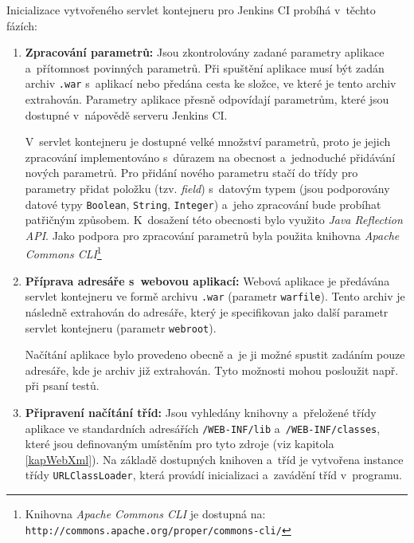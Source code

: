             Inicializace vytvořeného servlet kontejneru pro Jenkins CI probíhá
            v~těchto fázích:
            \begin{enumerate}
                \item \textbf{Zpracování parametrů:} Jsou zkontrolovány zadané parametry
                    aplikace a~přítomnost povinných parametrů. Při spuštění aplikace
                    musí být zadán archiv \texttt{.war} s~aplikací nebo předána cesta
                    ke složce, ve které je tento archiv extrahován. 
                    Parametry aplikace
                    přesně odpovídají parametrům, které jsou dostupné v~nápovědě 
                    serveru Jenkins CI. 
                    
                    V~servlet kontejneru je dostupné velké množství parametrů,
                    proto je jejich zpracování implementováno s~důrazem na obecnost a~jednoduché
                    přidávání nových parametrů. 
                    Pro přidání nového parametru stačí do třídy pro parametry přidat položku (tzv. \emph{field})
                    s~datovým typem (jsou podporovány datové typy \texttt{Boolean}, \texttt{String}, 
                    \texttt{Integer}) a~jeho zpracování bude probíhat patřičným
                    způsobem. K~dosažení této obecnosti bylo využito \emph{Java Reflection API}.
                    Jako podpora pro zpracování parametrů byla použita knihovna \emph{Apache
                    Commons CLI}\footnote{Knihovna \emph{Apache Commons CLI} je 
                    dostupná na: \texttt{http://commons.apache.org/proper/commons-cli/}}
                    
                \item \textbf{Příprava adresáře s~webovou aplikací:}  Webová aplikace
                    je předávána servlet kontejneru ve formě 
                    archivu \texttt{.war} (parametr \texttt{warfile}). Tento archiv je následně extrahován do 
                    adresáře, který je specifikovan jako další parametr servlet kontejneru (parametr \texttt{webroot}).
                    
                    Načítání aplikace bylo provedeno obecně a~je ji možné spustit zadáním
                    pouze adresáře, kde je archiv již extrahován. Tyto možnosti mohou posloužit
                    např. při psaní testů.

                \item \textbf{Připravení načítání tříd:} Jsou vyhledány knihovny 
                    a~přeložené třídy aplikace ve standardních adresářích 
                    \texttt{/WEB-INF/lib} a~\texttt{/WEB-INF/classes}, které jsou definovaným
                    umístěním pro tyto zdroje (viz kapitola \ref{kapWebXml}). 
                    Na základě dostupných knihoven a~tříd je vytvořena instance třídy \texttt{URLClassLoader},
                    která provádí inicializaci a~zavádění tříd v~programu. 
                    

\end{enumerate}
